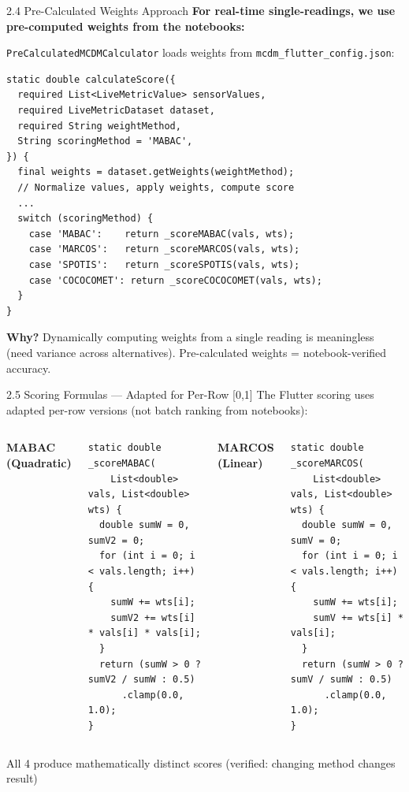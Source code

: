 \documentclass[aspectratio=169]{beamer}
\begin{document}
\begin{frame}{2.4 Pre-Calculated Weights Approach}
  \textbf{For real-time single-readings, we use pre-computed weights from the notebooks:}

  \vspace{0.2cm}
  \texttt{PreCalculatedMCDMCalculator} loads weights from \texttt{mcdm\_flutter\_config.json}:

  \vspace{0.2cm}
  \begin{lstlisting}[style=dartstyle]
static double calculateScore({
  required List<LiveMetricValue> sensorValues,
  required LiveMetricDataset dataset,
  required String weightMethod,
  String scoringMethod = 'MABAC',
}) {
  final weights = dataset.getWeights(weightMethod);
  // Normalize values, apply weights, compute score
  ...
  switch (scoringMethod) {
    case 'MABAC':    return _scoreMABAC(vals, wts);
    case 'MARCOS':   return _scoreMARCOS(vals, wts);
    case 'SPOTIS':   return _scoreSPOTIS(vals, wts);
    case 'COCOCOMET': return _scoreCOCOCOMET(vals, wts);
  }
}
  \end{lstlisting}

  \textbf{Why?} Dynamically computing weights from a single reading is meaningless
  (need variance across alternatives). Pre-calculated weights = notebook-verified accuracy.
\end{frame}

\begin{frame}{2.5 Scoring Formulas --- Adapted for Per-Row [0,1]}
  The Flutter scoring uses \alert{adapted per-row versions} (not batch ranking from notebooks):

  \begin{columns}
    \textbf{MABAC (Quadratic)}
    \begin{lstlisting}[style=dartstyle]
static double _scoreMABAC(
    List<double> vals, List<double> wts) {
  double sumW = 0, sumV2 = 0;
  for (int i = 0; i < vals.length; i++) {
    sumW += wts[i];
    sumV2 += wts[i] * vals[i] * vals[i];
  }
  return (sumW > 0 ? sumV2 / sumW : 0.5)
      .clamp(0.0, 1.0);
}
    \end{lstlisting}

    \textbf{MARCOS (Linear)}
    \begin{lstlisting}[style=dartstyle]
static double _scoreMARCOS(
    List<double> vals, List<double> wts) {
  double sumW = 0, sumV = 0;
  for (int i = 0; i < vals.length; i++) {
    sumW += wts[i];
    sumV += wts[i] * vals[i];
  }
  return (sumW > 0 ? sumV / sumW : 0.5)
      .clamp(0.0, 1.0);
}
    \end{lstlisting}
  \end{columns}

  \vspace{0.2cm}
  \centering
  \alert{All 4 produce mathematically distinct scores (verified: changing method changes result)}
\end{frame}
\end{document}
